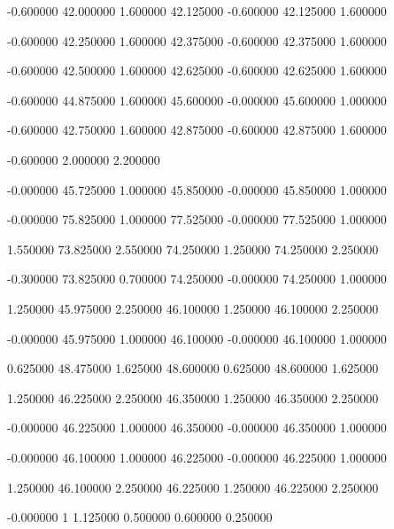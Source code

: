  {-0.600000} {42.000000} {1.600000} {42.125000} {-0.600000} {42.125000} {1.600000}

 {-0.600000} {42.250000} {1.600000} {42.375000} {-0.600000} {42.375000} {1.600000}

 {-0.600000} {42.500000} {1.600000} {42.625000} {-0.600000} {42.625000} {1.600000}

 {-0.600000} {44.875000} {1.600000} {45.600000} {-0.000000} {45.600000} {1.000000}

 {-0.600000} {42.750000} {1.600000} {42.875000} {-0.600000} {42.875000} {1.600000}

 {-0.600000} {2.000000} {2.200000}

 {-0.000000} {45.725000} {1.000000} {45.850000} {-0.000000} {45.850000} {1.000000}

 {-0.000000} {75.825000} {1.000000} {77.525000} {-0.000000} {77.525000} {1.000000}

 {1.550000} {73.825000} {2.550000} {74.250000} {1.250000} {74.250000} {2.250000}

 {-0.300000} {73.825000} {0.700000} {74.250000} {-0.000000} {74.250000} {1.000000}

 {1.250000} {45.975000} {2.250000} {46.100000} {1.250000} {46.100000} {2.250000}

 {-0.000000} {45.975000} {1.000000} {46.100000} {-0.000000} {46.100000} {1.000000}

 {0.625000} {48.475000} {1.625000} {48.600000} {0.625000} {48.600000} {1.625000}

 {1.250000} {46.225000} {2.250000} {46.350000} {1.250000} {46.350000} {2.250000}

 {-0.000000} {46.225000} {1.000000} {46.350000} {-0.000000} {46.350000} {1.000000}

 {-0.000000} {46.100000} {1.000000} {46.225000} {-0.000000} {46.225000} {1.000000}

 {1.250000} {46.100000} {2.250000} {46.225000} {1.250000} {46.225000} {2.250000}

 {-0.000000} {1} {1.125000} {0.500000} {0.600000} {0.250000}

